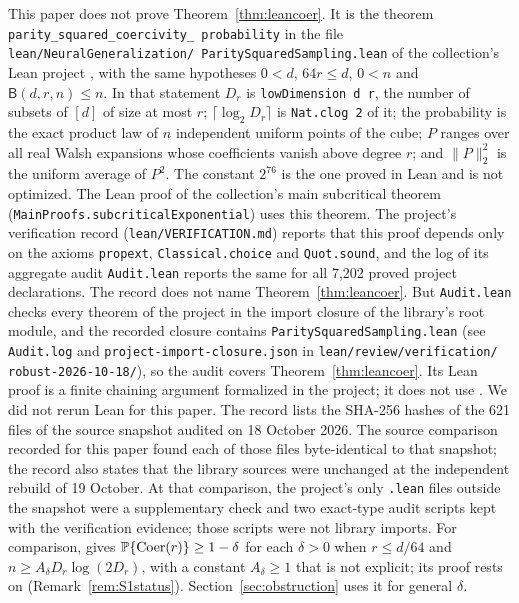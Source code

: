 This paper does not prove Theorem~\ref{thm:leancoer}. It is the theorem
\texttt{parity\_\allowbreak squared\_\allowbreak coercivity\_\allowbreak
probability} in the file
\texttt{lean/\allowbreak NeuralGeneralization/\allowbreak
ParitySquaredSampling.lean} of the collection's Lean project
\cite{leanproject}, with the
same hypotheses $0<d$, $64r\le d$, $0<n$ and $\mathsf B(d,r,n)\le n$. In
that statement $D_r$ is \texttt{lowDimension d r}, the number of subsets of
$[d]$ of size at most $r$; $\lceil\log_2D_r\rceil$ is
\texttt{Nat.clog 2} of it; the probability is the exact product law of $n$
independent uniform points of the cube; $P$ ranges over all real Walsh
expansions whose coefficients vanish above degree $r$; and $\|P\|_2^2$ is
the uniform average of $P^2$. The constant $2^{76}$ is the one proved in
Lean and is not optimized. The Lean proof of the collection's main
subcritical theorem (\texttt{MainProofs.\allowbreak subcriticalExponential})
uses this theorem. The project's verification record
(\texttt{lean/\allowbreak VERIFICATION.md}) reports that this proof depends
only on the axioms \texttt{propext}, \texttt{Classical.choice} and
\texttt{Quot.sound}, and the log of its aggregate audit \texttt{Audit.lean}
reports the same for all 7,202 proved project declarations. The record
does not name Theorem~\ref{thm:leancoer}. But \texttt{Audit.lean} checks
every theorem of the project in the import closure of the library's root
module, and the recorded closure contains
\texttt{ParitySquaredSampling.lean} (see \texttt{Audit.log} and
\texttt{project-\allowbreak import-\allowbreak closure.json} in
\texttt{lean/\allowbreak review/\allowbreak verification/\allowbreak
robust-2026-10-18/}), so the audit covers Theorem~\ref{thm:leancoer}. Its
Lean proof is a finite chaining argument formalized in the project; it does
not use \cite[Lemma~4.1]{subcritical}. We did not rerun Lean for this
paper. The record lists the SHA-256 hashes of the 621 files of the source
snapshot audited on 18 October 2026. The source comparison recorded for
this paper found each of those files byte-identical to that snapshot;
the record also states that the library sources were unchanged at the
independent rebuild of 19 October. At that comparison, the project's
only \texttt{.lean} files outside the snapshot were a supplementary check
and two exact-type audit scripts kept with the verification evidence;
those scripts were not library imports.
For comparison, \cite[Lemma~4.4]{subcritical} gives
$\mathbb P\{\mathrm{Coer}(r)\}\ge1-\delta$ for each $\delta>0$ when $r\le d/64$
and $n\ge A_\delta D_r\log(2D_r)$, with a constant $A_\delta\ge1$ that is
not explicit; its proof rests on \cite[Lemma~4.1]{subcritical}
(Remark~\ref{rem:S1status}). Section~\ref{sec:obstruction} uses it for
general $\delta$.

